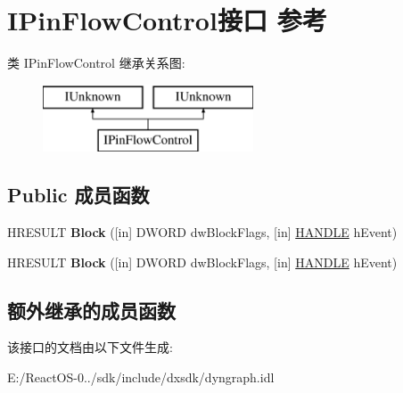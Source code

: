 \hypertarget{interface_i_pin_flow_control}{}\section{I\+Pin\+Flow\+Control接口 参考}
\label{interface_i_pin_flow_control}
类 I\+Pin\+Flow\+Control 继承关系图\+:\begin{figure}[H]
\begin{center}
\leavevmode
\includegraphics[height=2.000000cm]{interface_i_pin_flow_control}
\end{center}
\end{figure}
\subsection*{Public 成员函数}
\begin{DoxyCompactItemize}
\item 
\mbox{\label{interface_i_pin_flow_control_af7109c845f79f4ef2815553a16b6c1fe}} 
H\+R\+E\+S\+U\+LT {\bfseries Block} (\mbox{[}in\mbox{]} D\+W\+O\+RD dw\+Block\+Flags, \mbox{[}in\mbox{]} \hyperlink{interfacevoid}{H\+A\+N\+D\+LE} h\+Event)
\item 
\mbox{\label{interface_i_pin_flow_control_af7109c845f79f4ef2815553a16b6c1fe}} 
H\+R\+E\+S\+U\+LT {\bfseries Block} (\mbox{[}in\mbox{]} D\+W\+O\+RD dw\+Block\+Flags, \mbox{[}in\mbox{]} \hyperlink{interfacevoid}{H\+A\+N\+D\+LE} h\+Event)
\end{DoxyCompactItemize}
\subsection*{额外继承的成员函数}


该接口的文档由以下文件生成\+:\begin{DoxyCompactItemize}
\item 
E\+:/\+React\+O\+S-\/0../sdk/include/dxsdk/dyngraph.\+idl\end{DoxyCompactItemize}
